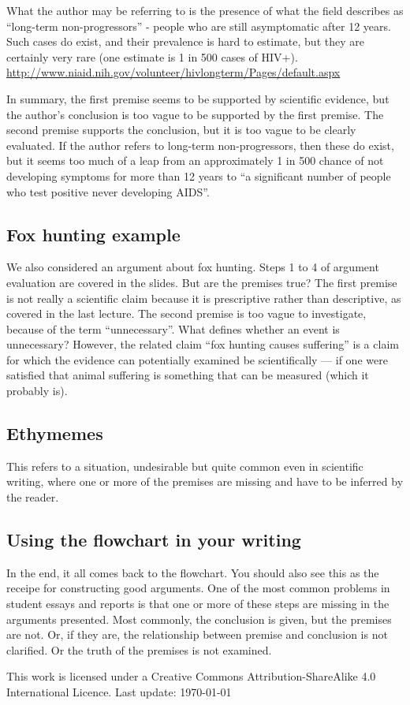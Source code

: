 \documentclass[12pt]{article}
\begin{document}
What the author may be referring to is the presence of what the field
describes as ``long-term non-progressors'' - people who are still
asymptomatic after 12 years. Such cases do exist, and their prevalence
is hard to estimate, but they are certainly very rare (one estimate is
1 in 500 cases of
HIV+). \url{http://www.niaid.nih.gov/volunteer/hivlongterm/Pages/default.aspx}

In summary, the first premise seems to be supported by scientific
evidence, but the author's conclusion is too vague to be supported by
the first premise.  The second premise supports the conclusion, but it
is too vague to be clearly evaluated. If the author refers to
long-term non-progressors, then these do exist, but it seems too much
of a leap from an approximately 1 in 500 chance of not developing
symptoms for more than 12 years to ``a significant number of people
who test positive never developing AIDS''.

\subsection{Fox hunting example}

We also considered an argument about fox hunting. Steps 1 to 4 of
argument evaluation are covered in the slides. But are the premises
true? The first premise is not really a scientific claim because it is
prescriptive rather than descriptive, as covered in the last
lecture. The second premise is too vague to investigate, because of
the term ``unnecessary''. What defines whether an event is
unnecessary? However, the related claim ``fox hunting causes
suffering'' is a claim for which the evidence can potentially examined
be scientifically --- if one were satisfied that animal suffering is
something that can be measured (which it probably is).

\subsection{Ethymemes}

This refers to a situation, undesirable but quite common even in
scientific writing, where one or more of the premises are missing and
have to be inferred by the reader.

\subsection{Using the flowchart in your writing}

In the end, it all comes back to the flowchart. You should also see
this as the receipe for constructing good arguments. One of the most
common problems in student essays and reports is that one or more of
these steps are missing in the arguments presented. Most commonly, the
conclusion is given, but the premises are not. Or, if they are, the
relationship between premise and conclusion is not clarified. Or the
truth of the premises is not examined.

\vspace{12pt}

\tiny
This work is licensed under a Creative Commons Attribution-ShareAlike
4.0 International Licence. Last update: \today
\end{document}
